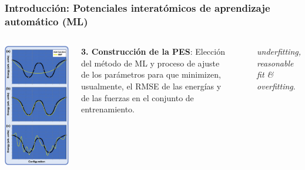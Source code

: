 \documentclass[aspectratio=169]{beamer}
\let\oldtextbf\textbf
\renewcommand{\textbf}[1]{\textcolor{nordblue}{\oldtextbf{#1}}}
\begin{document}
    \begin{frame}
        \frametitle{Introducción: Potenciales interatómicos de aprendizaje 
        automático (ML)}
        \begin{columns}
            \begin{center}
                \includegraphics[width=0.65\columnwidth]{intro-fitting.png}
            \end{center}

            \textbf{3. Construcción de la PES}: Elección del método de ML y 
            proceso de ajuste de los parámetros para que minimizen, usualmente, 
            el RMSE de las energías y de las fuerzas en el conjunto de 
            entrenamiento.

            \

            \textit{underfitting, reasonable fit \& overfitting}.
        \end{columns}

	\end{frame}
    
\end{document}
